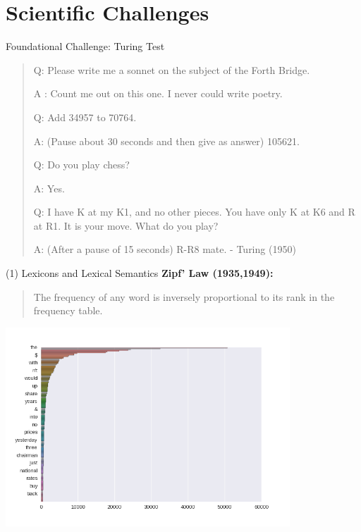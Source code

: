 \documentclass{beamer}
\begin{document}
\section{Scientific Challenges}

\begin{frame}{Foundational Challenge: Turing Test}
  \begin{quote}
    Q: Please write me a sonnet on the subject of the Forth Bridge.

    A : Count me out on this one. I never could write poetry.

    Q: Add 34957 to 70764.
    
    A: (Pause about 30 seconds and then give as answer) 105621.
    
    Q: Do you play chess?
    
    A: Yes.
    
    Q: I have K at my K1, and no other pieces. You have only K at K6 and R at R1. It is your move. What do you play?

    A: (After a pause of 15 seconds) R-R8 mate.
      {\normalfont - Turing (1950)}
  \end{quote}

\end{frame}

\begin{frame}{(1) Lexicons and Lexical Semantics}
  \textbf{Zipf' Law (1935,1949):}
  \begin{quote}
    The frequency of any word is inversely proportional to its rank in the frequency table.
  \end{quote}


     \begin{center}
       \includegraphics[width=0.8\textwidth]{../notebooks/zipf}         
     \end{center}
\end{frame}
\end{document}

